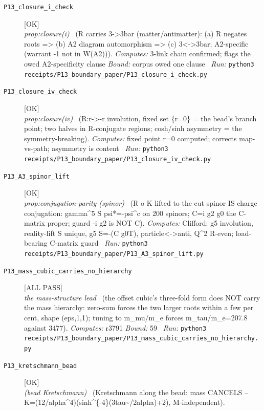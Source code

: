 \begin{description}
\item[\label{rcpt:P13_closure_i_check}\texttt{P13\_closure\_i\_check}]\hfill\textsf{[OK]}\\
\textit{prop:closure(i)} \ (R carries 3->3bar (matter/antimatter): (a) R negates roots => (b) A2 diagram automorphism => (c) 3<->3bar; A2-specific (warrant -1 not in W(A2))). 
\emph{Computes:} 3-link chain confirmed; flags the owed A2-specificity clause
 \emph{Bound:} corpus owed one clause
\ \emph{Run:} \texttt{python3 receipts/P13\_boundary\_paper/P13\_closure\_i\_check.py}
\item[\label{rcpt:P13_closure_iv_check}\texttt{P13\_closure\_iv\_check}]\hfill\textsf{[OK]}\\
\textit{prop:closure(iv)} \ (R:r->-r involution, fixed set \{r=0\} = the bead's branch point; two halves in R-conjugate regions; cosh/sinh asymmetry = the symmetry-breaking). 
\emph{Computes:} fixed point r=0 computed; corrects map-vs-path; asymmetry is content
\ \emph{Run:} \texttt{python3 receipts/P13\_boundary\_paper/P13\_closure\_iv\_check.py}
\item[\label{rcpt:P13_A3_spinor_lift}\texttt{P13\_A3\_spinor\_lift}]\hfill\textsf{[OK]}\\
\textit{prop:conjugation-parity (spinor)} \ (R o K lifted to the cut spinor IS charge conjugation: gamma\textasciicircum{}5 S psi*=-psi\textasciicircum{}c on 200 spinors; C=i g2 g0 the C-matrix proper; guard -i g2 is NOT C). 
\emph{Computes:} Clifford: g5 involution, reality-lift S unique, g5 S=-(C g0T), particle<->anti, Q\textasciicircum{}2 R-even; load-bearing C-matrix guard
\ \emph{Run:} \texttt{python3 receipts/P13\_boundary\_paper/P13\_A3\_spinor\_lift.py}
\item[\label{rcpt:P13_mass_cubic_carries_no_hierarchy}\texttt{P13\_mass\_cubic\_carries\_no\_hierarchy}]\hfill\textsf{[ALL PASS]}\\
\textit{the mass-structure lead} \ (the offset cubic's three-fold form does NOT carry the mass hierarchy: zero-sum forces the two larger roots within a few per cent, shape (eps,1,1); tuning to m\_mu/m\_e forces m\_tau/m\_e=207.8 against 3477). 
\emph{Computes:} r3791
 \emph{Bound:} 59
\ \emph{Run:} \texttt{python3 receipts/P13\_boundary\_paper/P13\_mass\_cubic\_carries\_no\_hierarchy.py}
\item[\label{rcpt:P13_kretschmann_bead}\texttt{P13\_kretschmann\_bead}]\hfill\textsf{[OK]}\\
\textit{(bead Kretschmann)} \ (Kretschmann along the bead: mass CANCELS -- K=(12/alpha\textasciicircum{}4)(sinh\textasciicircum{}\{-4\}(3tau\textasciitilde{}/2alpha)+2), M-independent). 

\end{description}

